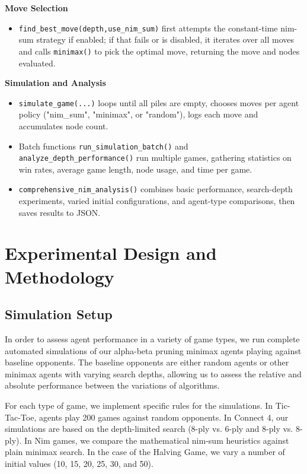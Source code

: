 \documentclass[12pt]{article}
\begin{document}
\noindent\textbf{Move Selection}
\begin{itemize}
  \item \texttt{find\_best\_move(depth,use\_nim\_sum)} first attempts the constant-time nim-sum strategy if enabled; if that fails or is disabled, it iterates over all moves and calls \texttt{minimax()} to pick the optimal move, returning the move and nodes evaluated.
\end{itemize}

\noindent\textbf{Simulation and Analysis}
\begin{itemize}
  \item \texttt{simulate\_game(...)} loops until all piles are empty, chooses moves per agent policy ("nim\_sum", "minimax", or "random"), logs each move and accumulates node count.
  \item Batch functions \texttt{run\_simulation\_batch()} and \texttt{analyze\_depth\_performance()} run multiple games, gathering statistics on win rates, average game length, node usage, and time per game.
  \item \texttt{comprehensive\_nim\_analysis()} combines basic performance, search-depth experiments, varied initial configurations, and agent-type comparisons, then saves results to JSON.
\end{itemize}

\section{Experimental Design and Methodology}

\subsection{Simulation Setup}

In order to assess agent performance in a variety of game types, we run complete automated simulations of our alpha-beta pruning minimax agents playing against baseline opponents. The baseline opponents are either random agents or other minimax agents with varying search depths, allowing us to assess the relative and absolute performance between the variations of algorithms.

For each type of game, we implement specific rules for the simulations. In Tic-Tac-Toe, agents play 200 games against random opponents. In Connect 4, our simulations are based on the depth-limited search (8-ply vs. 6-ply and 8-ply vs. 8-ply). In Nim games, we compare the mathematical nim-sum heuristics against plain minimax search. In the case of the Halving Game, we vary a number of initial values (10, 15, 20, 25, 30, and 50).
\end{document}
